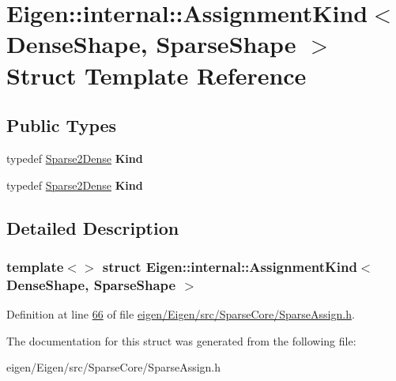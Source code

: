 \hypertarget{struct_eigen_1_1internal_1_1_assignment_kind_3_01_dense_shape_00_01_sparse_shape_01_4}{}\section{Eigen\+:\+:internal\+:\+:Assignment\+Kind$<$ Dense\+Shape, Sparse\+Shape $>$ Struct Template Reference}
\label{struct_eigen_1_1internal_1_1_assignment_kind_3_01_dense_shape_00_01_sparse_shape_01_4}
\subsection*{Public Types}
\begin{DoxyCompactItemize}
\item 
\mbox{\label{struct_eigen_1_1internal_1_1_assignment_kind_3_01_dense_shape_00_01_sparse_shape_01_4_a750527530f46241a2f8f979037a6ef98}} 
typedef \hyperlink{struct_eigen_1_1internal_1_1_sparse2_dense}{Sparse2\+Dense} {\bfseries Kind}
\item 
\mbox{\label{struct_eigen_1_1internal_1_1_assignment_kind_3_01_dense_shape_00_01_sparse_shape_01_4_a750527530f46241a2f8f979037a6ef98}} 
typedef \hyperlink{struct_eigen_1_1internal_1_1_sparse2_dense}{Sparse2\+Dense} {\bfseries Kind}
\end{DoxyCompactItemize}


\subsection{Detailed Description}
\subsubsection*{template$<$$>$\newline
struct Eigen\+::internal\+::\+Assignment\+Kind$<$ Dense\+Shape, Sparse\+Shape $>$}



Definition at line \hyperlink{eigen_2_eigen_2src_2_sparse_core_2_sparse_assign_8h_source_l00066}{66} of file \hyperlink{eigen_2_eigen_2src_2_sparse_core_2_sparse_assign_8h_source}{eigen/\+Eigen/src/\+Sparse\+Core/\+Sparse\+Assign.\+h}.



The documentation for this struct was generated from the following file\+:\begin{DoxyCompactItemize}
\item 
eigen/\+Eigen/src/\+Sparse\+Core/\+Sparse\+Assign.\+h\end{DoxyCompactItemize}
